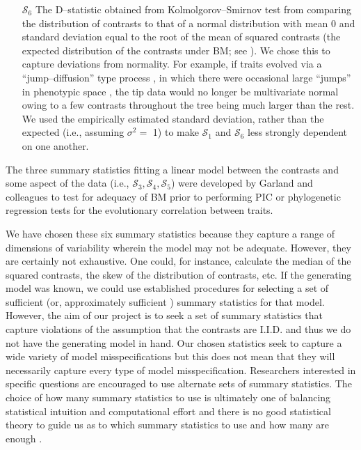\documentclass[a4paper,12pt]{article}
\begin{document}
\begin{enumerate}
\item[$\mathcal{S}_6$] The D--statistic obtained from Kolmolgorov--Smirnov test from comparing the distribution of contrasts to that of a normal distribution with mean 0 and standard deviation equal to the root of the mean of squared contrasts (the expected distribution of the contrasts under BM; see \citep{Felsenstein1985, Rohlf2001}). We chose this to capture deviations from normality. For example, if traits evolved via a ``jump--diffusion'' type process \citep{Landis2012}, in which there were occasional large ``jumps'' in phenotypic space \citep{PennellPE}, the tip data would no longer be multivariate normal owing to a few contrasts throughout the tree being much larger than the rest.  We used the empirically estimated standard deviation, rather than the expected (i.e., assuming $\sigma^2=$ 1) to make $\mathcal{S}_1$ and $\mathcal{S}_6$ less strongly dependent on one another.

\end{enumerate}

The three summary statistics fitting a linear model between the contrasts and some aspect of the data (i.e., $\mathcal{S}_3, \mathcal{S}_4, \mathcal{S}_5$) were developed by Garland and colleagues \citep{Garland1992, Garland1993,  Diaz1996} to test for adequacy of BM prior to performing PIC \citep{Felsenstein1985} or phylogenetic regression \citep{Grafen1989} tests for the evolutionary correlation between traits. 

We have chosen these six summary statistics because they capture a range of dimensions of variability wherein the model may not be adequate. However, they are certainly not exhaustive. One could, for instance, calculate the median of the squared contrasts, the skew of the distribution of contrasts, etc. If the generating model was known, we could use established procedures for selecting a set of sufficient (or, approximately sufficient \citep{MajoramJoyce}) summary statistics for that model. However, the aim of our project is to seek a set of summary statistics that capture violations of the assumption that the contrasts are I.I.D. and thus we do not have the generating model in hand. Our chosen statistics seek to capture a wide variety of model misspecifications but this does not mean that they will necessarily capture every type of model misspecification. Researchers interested in specific questions are encouraged to use alternate sets of summary statistics.  The choice of how many summary statistics to use is ultimately one of balancing statistical intuition and computational effort and there is no good statistical theory to guide us as to which summary statistics to use and how many are enough \citep{Gelmanbook}.
\end{document}
